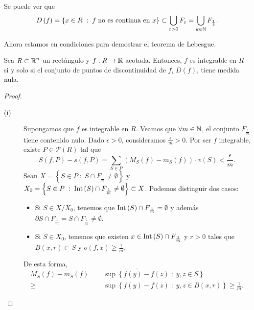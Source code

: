 \begin{observation}
Se puede ver que 
\[D\left(f\right)= \left\{ x \in R \; : \; f \; \text{no es continua en }x\right\} \subset \bigcup_{\varepsilon > 0}F_{\varepsilon } = \bigcup_{k \in \mathbb{N}}F_{\frac{1}{k}} .\]
\end{observation}
Ahora estamos en condiciones para demostrar el teorema de Lebesgue. 
\begin{theorem}
Sea $\displaystyle R \subset \mathbb{R}^{n} $ un rectángulo y $\displaystyle f : R \to \mathbb{R} $ acotada. Entonces, $\displaystyle f $ es integrable en $\displaystyle R $ si y solo si el conjunto de puntos de discontinuidad de $\displaystyle f $, $\displaystyle D\left(f\right) $, tiene medida nula.
\end{theorem}
\begin{proof}
\begin{description}
\item[(i)] Supongamos que $\displaystyle f $ es integrable en $\displaystyle R $. Veamos que $\displaystyle \forall m \in \mathbb{N} $, el conjunto $\displaystyle F_{\frac{1}{m}} $ tiene contenido nulo. Dado $\displaystyle \epsilon > 0 $, consideramos $\displaystyle \frac{\epsilon }{m} > 0 $. Por ser $\displaystyle f $ integrable, existe $\displaystyle P \in \mathcal{P}\left(R\right) $ tal que 
	\[S\left(f,P\right)-s\left(f,P\right) = \sum^{}_{S \in P}\left(M_{S}\left(f\right)-m_{S}\left(f\right)\right) \cdot v\left(S\right) < \frac{\epsilon }{m} .\]
	Sean $\displaystyle X= \left\{ S \in P \; : \; S \cap F_{\frac{1}{m}} \neq \emptyset\right\}  $ y $\displaystyle X_{0} = \left\{ S \in P \; : \; \operatorname{Int}\left(S\right)\cap F_{\frac{1}{m}}\neq\emptyset\right\} \subset X $. Podemos distinguir dos casos:
	\begin{itemize}
	\item Si $\displaystyle S \in X/X_{0} $, tenemos que $\displaystyle \operatorname{Int}\left(S\right) \cap F_{\frac{1}{m}} = \emptyset $ y además $\displaystyle \partial S \cap F_{\frac{1}{m}} = S \cap F_{\frac{1}{m}}\neq \emptyset $. 
	\item Si $\displaystyle S \in X_{0} $, tenemos que existen $\displaystyle x \in \operatorname{Int}\left(S\right) \cap F_{\frac{1}{m}} $ y $\displaystyle r > 0 $ tales que $\displaystyle B\left(x,r\right)\subset S $ y $\displaystyle o\left(f,x\right)\geq \frac{1}{m} $. 
	\end{itemize}
De esta forma, 
\[ .\]
\[
\begin{split}
	M_{S}\left(f\right)-m_{S}\left(f\right)=&\sup \left\{ f\left(y\right)-f\left(z\right) \; : \; y,z \in S\right\}  \\ \geq & \sup \left\{ f\left(y\right)-f\left(z\right) \; : \; y,z \in B\left(x,r\right)\right\} \geq \frac{1}{m}.
\end{split}
\]


\end{description}
\end{proof}
